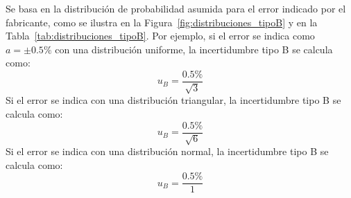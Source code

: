 \begin{marginfigure}[-10em]
    \centering
    \shorthandoff{>}
\caption[Ejemplos de distribuciones de probabilidad para la evaluación tipo B de la incertidumbre]{Ejemplos de distribuciones de probabilidad para la evaluación tipo B de la incertidumbre. La distribución rectangular (uniforme) se utiliza cuando el error es igualmente probable dentro de un rango, la distribución triangular se utiliza cuando el error es más probable cerca del valor central, y la distribución normal se utiliza cuando el error sigue una distribución gaussiana. En la distribución gaussiana s es la desviación típica.}\label{fig:distribuciones_tipoB}
\end{marginfigure}

Se basa en la distribución de probabilidad asumida para el error indicado por el fabricante, como se ilustra en la Figura~\ref{fig:distribuciones_tipoB} y en la Tabla~\ref{tab:distribuciones_tipoB}. Por ejemplo, si el error se indica como $a = \pm 0.5\%$ con una distribución uniforme, la incertidumbre tipo B se calcula como:
    \[
    u_B = \frac{0.5\%}{\sqrt{3}}
    \]  
    Si el error se indica con una distribución triangular, la incertidumbre tipo B se calcula como:
    \[
    u_B = \frac{0.5\%}{\sqrt{6}}
    \]
    Si el error se indica con una distribución normal, la incertidumbre tipo B se calcula como:
    \[
    u_B = \frac{0.5\%}{1}
    \]  


